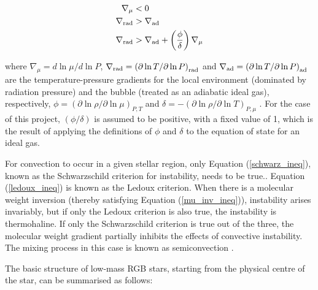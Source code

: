 \documentclass[12pt, a4paper]{report}
\begin{document}
\begin{align}
\nabla _{\mu} &< 0 \label{mu_inv_ineq} \\
\nabla _{\textnormal{rad}} &> \nabla _{\textnormal{ad}} \label{schwarz_ineq} \\
\nabla _{\textnormal{rad}} &> \nabla _{\textnormal{ad}} + \left( \frac{\phi}{\delta} \right) \nabla _{\mu} \label{ledoux_ineq}
\end{align}

where $\nabla _{\mu} = d\ln\mu / d\ln P$, $\nabla _{\textnormal{rad}} = \left(\partial\ln T / \partial\ln P \right)_{\textnormal{rad}}$ and $\nabla _{\textnormal{ad}} = \left(\partial\ln T / \partial\ln P \right)_{\textnormal{ad}}$ are the temperature-pressure gradients for the local environment (dominated by radiation pressure) and the bubble (treated as an adiabatic ideal gas), respectively, $\phi = \left( \partial \ln\rho / \partial \ln\mu \right)_{P,T}$ and $\delta = -\left( \partial \ln\rho / \partial \ln T \right)_{P,\mu}$  \citep{1980A&A....91..175K}. For the case of this project, $(\phi/\delta)$ is assumed to be positive, with a fixed value of 1, which is the result of applying the definitions of $\phi$ and $\delta$ to the equation of state for an ideal gas.

For convection to occur in a given stellar region, only Equation (\ref{schwarz_ineq}), known as the Schwarzschild criterion for instability, needs to be true.. Equation (\ref{ledoux_ineq}) is known as the Ledoux criterion. When there is a molecular weight inversion (thereby satisfying Equation (\ref{mu_inv_ineq})), instability arises invariably, but if only the Ledoux criterion is also true, the instability is thermohaline. If only the Schwarzschild criterion is true out of the three, the molecular weight gradient partially inhibits the effects of convective instability. The mixing process in this case is known as semiconvection \citep{2016ApJ...817...54M}.


The basic structure of low-mass  RGB stars, starting from the physical centre of the star, can be summarised as follows:
\end{document}
